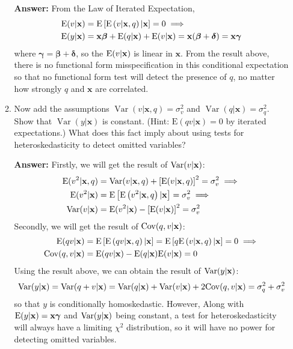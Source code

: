 \documentclass[UTF8]{article} %
\begin{document}
\begin{enumerate}
\begin{enumerate}
        \textbf{Answer:} From the Law of Iterated Expectation,
        \begin{align*}
            \mathrm{E}(v|\mathbf{x}) &= \mathrm{E}\left[ \mathrm{E}\left( v|\mathbf{x},q \right)|\mathbf{x} \right] = 0 \implies \\
            \mathrm{E}(y|\mathbf{x}) &= \mathbf{x} \boldsymbol{\beta} + \mathrm{E}(q|\mathbf{x}) + \mathrm{E}(v|\mathbf{x}) = \mathbf{x}(\bm{\beta}+\bm{\delta}) = \mathbf{x}\bm{\gamma}
        \end{align*}
        where $\bm{\gamma} = \bm{\beta}+\bm{\delta}$, so the $\mathrm{E}(v|\mathbf{x})$ is linear in $\mathbf{x}$. From the result above, there is no functional form misspecification in this conditional expectation so that no functional form test will detect the presence of $q$, no matter how strongly $q$ and $\mathbf{x}$ are correlated.
        
        \item Now add the assumptions $\operatorname{Var}(v | \mathbf{x}, q)=\sigma_{v}^{2}$ and $\operatorname{Var}(q | \mathbf{x})=\sigma_{q}^{2}$. Show that $\operatorname{Var}(y | \mathbf{x})$ is constant. (Hint: $\mathrm{E}(q v | \mathbf{x})=0$ by iterated expectations.) What does this fact imply about using tests for heteroskedasticity to detect omitted variables?
        
        \textbf{Answer:} Firstly, we will get the result of $\mathrm{Var}(v|\mathbf{x})$: 
        \begin{align*}
            \mathrm{E}(v^2|\mathbf{x},q) &= \mathrm{Var}(v|\mathbf{x},q) + \left[ \mathrm{E}(v|\mathbf{x},q) \right]^2 = \sigma^2_v \implies \\
            \mathrm{E}(v^2|\mathbf{x}) &= \mathrm{E}\left[ \mathrm{E}\left( v^2|\mathbf{x},q \right)|\mathbf{x} \right] = \sigma^2_v \implies \\
            \mathrm{Var}(v|\mathbf{x}) &= \mathrm{E}(v^2|\mathbf{x}) - \left[ \mathrm{E}(v|\mathbf{x}) \right]^2 = \sigma^2_v
        \end{align*}
        Secondly, we will get the result of $\mathrm{Cov}(q,v|\mathbf{x})$:
        \begin{align*}
            \mathrm{E}(qv|\mathbf{x}) &= \mathrm{E}\left[ \mathrm{E}\left( qv|\mathbf{x},q \right)|\mathbf{x} \right] = \mathrm{E}\left[ q \mathrm{E} \left( v|\mathbf{x},q \right)|\mathbf{x} \right] = 0 \implies \\
            \mathrm{Cov}(q,v|\mathbf{x}) &= \mathrm{E}(qv|\mathbf{x}) - \mathrm{E}(q|\mathbf{x}) \mathrm{E}(v|\mathbf{x}) = 0
        \end{align*}
        Using the result above, we can obtain the result of $\mathrm{Var}(y|\mathbf{x})$: 
        \[ \mathrm{Var}(y|\mathbf{x}) = \mathrm{Var}(q+v|\mathbf{x}) = \mathrm{Var}(q|\mathbf{x}) + \mathrm{Var}(v|\mathbf{x}) + 2\mathrm{Cov}(q,v|\mathbf{x}) = \sigma^2_q + \sigma^2_v \]
        so that $y$ is conditionally homoskedastic. However, Along with $\mathrm{E}(y|\mathbf{x}) = \mathbf{x}\bm{\gamma}$ and $\mathrm{Var}(y|\mathbf{x})$ being constant, a test for heteroskedasticity will always have a limiting $\chi^2$ distribution, so it will have no power for detecting omitted variables.
        

\end{enumerate}
\end{enumerate}
\end{document}
